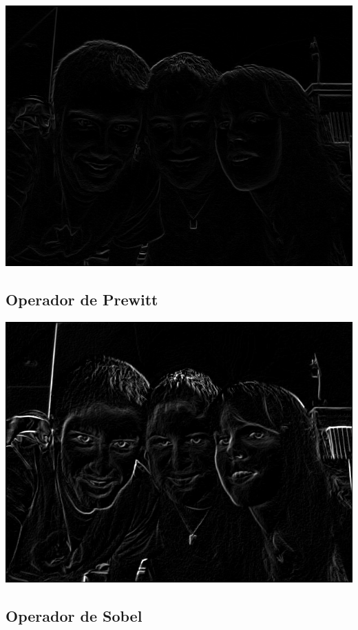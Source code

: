\documentclass[a4paper, 10pt]{article}
\begin{document}
\begin{center}
	\includegraphics[scale=0.30]{Graficos/out/roberts_foto3.jpg}
\end{center}


\subsection{Operador de Prewitt}

\begin{center}
	\includegraphics[scale=0.30]{Graficos/out/prewitt_foto3.jpg}
\end{center}

\subsection{Operador de Sobel}
\end{document}
